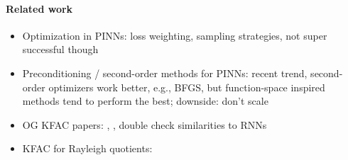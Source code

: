 \paragraph{Related work}
\begin{itemize}
    \item Optimization in PINNs: loss weighting, sampling strategies, not super successful though
    \item Preconditioning / second-order methods for PINNs: recent trend, second-order optimizers work better, e.g., BFGS, but function-space inspired methods tend to perform the best; downside: don't scale 
    \item OG KFAC papers: \cite{martens2015optimizing}, \cite{martens2018kroneckerfactored}, double check similarities to RNNs
    \item KFAC for Rayleigh quotients:
\end{itemize}

